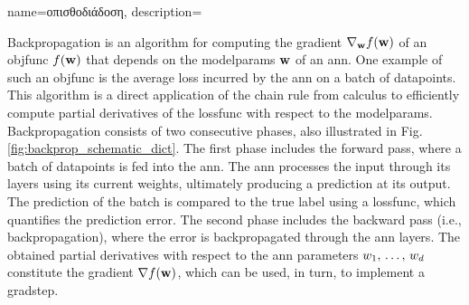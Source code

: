 {name={\foreignlanguage{greek}{οπισθοδιάδοση}},
 	description={Backpropagation is an \gls{algorithm} for computing the \gls{gradient} 
	 	$\nabla_{{\bf w}} f({\bf w})$ of an \gls{objfunc} $f({\bf w})$ that depends on the 
	  	\gls{modelparams} ${\bf w}$ of an \gls{ann}. One example of such an \gls{objfunc} 
	  	is the average \gls{loss} incurred by the \gls{ann} on a \gls{batch} of \gls{datapoint}s. 
	  	This \gls{algorithm} is a direct application of the chain rule from calculus to 
	  	efficiently compute partial derivatives of the \gls{lossfunc} with respect to the \gls{modelparams}.
		Backpropagation consists of two consecutive phases, also illustrated in Fig. \ref{fig:backprop_schematic_dict}. 
		The first phase includes the forward pass, where a \gls{batch} of 
		\gls{datapoint}s is fed into the \gls{ann}. The \gls{ann} processes the input through its \gls{layer}s using its current 
		\gls{weights}, ultimately producing a \gls{prediction} at its output. The \gls{prediction} of the \gls{batch} is compared to 
	   	the true \gls{label} using a \gls{lossfunc}, which quantifies the \gls{prediction} error. The second phase includes the 
		backward pass (i.e., backpropagation), where the error is backpropagated through the \gls{ann} \gls{layer}s. 
	   	The obtained partial derivatives with respect to the \gls{ann} \gls{parameter}s $w_{1},\,\ldots,\,w_{d}$ 
	   	constitute the \gls{gradient} $\nabla f({\bf w})$, which can be used, in turn, to implement a \gls{gradstep}. 
	   	\begin{figure}[H]
		\centering
\end{figure}}}
